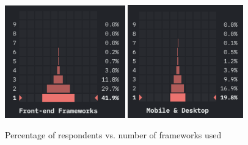 \begin{figure}
  \centering
  \includegraphics[width=5.2cm]{images/frontend_frameworks_2020.png}
  \qquad
  \includegraphics[width=5cm]{images/hybrid_frameworks_2020.png}
  \caption{Percentage of respondents vs. number of frameworks used}%
  \label{fig:num_of_frameworks_used}%
\end{figure}





